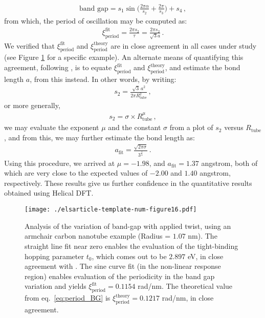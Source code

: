\documentclass[preprint,12pt, 3p, sort&compress]{elsarticle}
\begin{document}
\begin{align}
\text{band gap} = s_1 \sin \bigg(\frac{2\pi \alpha}{s_2} + \frac{2\pi}{s_3}\bigg) + s_4\,,
\label{eq:band_gap_sine_fit}
\end{align}
from which, the period of oscillation may be computed as:
\begin{align}
\xi_{\text{period}}^{\text{fit}} = \frac{2\pi s_2}{\tau} =  \frac{2\pi s_2}{\sqrt{3}a}\,.
\label{eq:gamma_s2}
\end{align}
We verified that $\xi_{\text{period}}^{\text{fit}}$ and $\xi_{\text{period}}^{\text{theory}}$ are in close agreement in all cases under study (see Figure \ref{fig:s2_t0_carbon} for a specific example). An alternate means of quantifying this agreement, following \citep{Dumitrica_Tight_Binding1}, is to equate $\xi_{\text{period}}^{\text{fit}}$ and $\xi_{\text{period}}^{\text{theory}}$, and estimate the bond length $a$, from this instead. In other words, by writing:
\begin{align}
s_2 =  \frac{\sqrt{3}\,a^2}{2\pi R_{\text{tube}}^2}\,,
\end{align}
or more generally, 
\begin{align}
s_2 = \sigma \times R_{\text{tube}}^{\mu}\,,
\label{eq:s2_scaling}
\end{align}
we may evaluate the exponent $\mu$ and the constant $\sigma$ from a plot of $s_2$ versus $R_{\text{tube}}$, and from this, we may further estimate the bond length as:
\begin{align}
a_{\text{fit}} = \frac{\sqrt{2 \pi \sigma}}{3^{\frac{1}{4}}}\,.
\label{eq:a_fit}
\end{align}
Using this procedure, {we arrived at} $\mu=-1.98$, and $a_{\text{fit}} = 1.37$ angstrom, both of which are very close to the expected values of $-2.00$ and $1.40$ angstrom, respectively. These results give us further confidence in the quantitative results obtained using Helical DFT.
\begin{figure}
\centering
\subfloat
{\texttt{[image: ./elsarticle-template-num-figure16.pdf]}
}
\caption{Analysis of the variation of band-gap with applied twist, using an armchair carbon nanotube example (Radius = $1.07$ nm). The straight line fit near zero enables the evaluation of the tight-binding hopping parameter $t_0$, which comes out to be $2.897$ eV, in close agreement with \citep{Dumitrica_Tight_Binding1, correa2010tight, yang1999band}. The sine curve fit (in the non-linear response region) enables evaluation of the periodicity in the band gap variation and yields $\xi_{\text{period}}^{\text{fit}} =  0.1154$ rad/nm. The theoretical value from eq.~\ref{eq:period_BG} is $\xi_{\text{period}}^{\text{theory}} = 0.1217$ rad/nm, in close agreement.}
\label{fig:s2_t0_carbon}
\end{figure}
\end{document}
